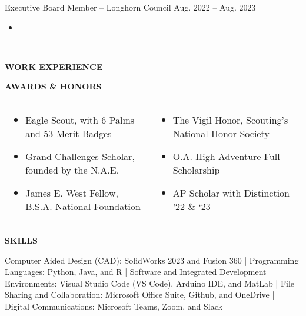 \documentclass[18pt]{article}
\begin{document}
Executive Board Member – Longhorn Council \hfill Aug. 2022 – Aug. 2023 \\
\begin{itemize}[noitemsep]
  \vspace{-\baselineskip}
  \item 
  \vspace{-\baselineskip}
\end{itemize}\\

\begin{center}
    \textbf{WORK EXPERIENCE}
    \hrulefill
\end{center}

\begin{center}
    \textbf{AWARDS \& HONORS}
    \hrulefill
\end{center}
\vspace{-0.5\baselineskip}


\begin{tabular}{p{}p{}}

\begin{itemize}[noitemsep]
  \vspace{-\baselineskip}
  \item Eagle Scout, with 6 Palms and 53 Merit Badges
  \item Grand Challenges Scholar, founded by the N.A.E. 
  \item James E. West Fellow, B.S.A. National Foundation
  \vspace{-\baselineskip}
  \end{itemize}
  &
\begin{itemize}[noitemsep]
  \vspace{-\baselineskip}
  \item The Vigil Honor, Scouting’s National Honor Society 
  \item O.A. High Adventure Full Scholarship
  \item AP Scholar with Distinction ’22 \& ‘23 
  \vspace{-\baselineskip}
  
\end{itemize}\\

\end{tabular}



\begin{center}
    \textbf{SKILLS}
    \hrulefill
\end{center}
\vspace{-1.5\baselineskip}


\justify Computer Aided Design (CAD): SolidWorks 2023 and Fusion 360 | Programming Languages: Python, Java, and R | Software and Integrated Development Environments: Visual Studio Code (VS Code), Arduino IDE, and MatLab | File Sharing and Collaboration: Microsoft Office Suite, Github, and OneDrive | Digital Communications: Microsoft Teams, Zoom, and Slack
\end{document}
